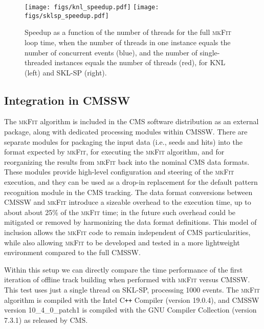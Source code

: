 \documentclass[a4paper,11pt]{article}
\newcommand{\mkFit}{\textsc{mkFit}\xspace}
\newcommand{\cpp}{C\texttt{++}\xspace}
\newcommand{\Intel}{Intel\textregistered\xspace}
\begin{document}
\begin{figure}[htbp]
  \begin{center}
    \texttt{[image: figs/knl\_speedup.pdf]}    
    \texttt{[image: figs/sklsp\_speedup.pdf]}
    \caption{Speedup as a function of the number of threads for the full \mkFit loop time, 
      when the number of threads in one instance equals the number of concurrent events (blue), and the number of 
      single-threaded instances equals the number of threads (red), for KNL (left) and SKL-SP
      (right).}
    \label{fig:mkfit_time_thru}
  \end{center}
\end{figure}

\subsection{Integration in CMSSW}
\label{CMSSW}

The \mkFit algorithm is included in the CMS software distribution as an external package, along with dedicated processing modules within CMSSW. There are separate modules for packaging the input data (i.e., seeds and hits) into the format expected by \mkFit, for executing the \mkFit algorithm, and for reorganizing the results from \mkFit back into the nominal CMS data formats. These modules provide high-level configuration and steering of the \mkFit execution, and they can be used as a drop-in replacement for the default pattern recognition module in the CMS tracking. The data format conversions between CMSSW and \mkFit introduce a sizeable overhead to the execution time, up to about about 25\% of the \mkFit time; in the future such overhead could be mitigated or removed by harmonizing the data format definitions. This model of inclusion allows the \mkFit code to remain independent of CMS particularities, while also allowing \mkFit to be developed and tested in a more lightweight environment compared to the full CMSSW. 

Within this setup we can directly compare the time performance of the first iteration of offline track building when performed with \mkFit versus CMSSW. 
This test uses just a single thread on SKL-SP, processing 1000 events. 
The \mkFit algorithm is compiled with the \Intel \cpp Compiler (version 19.0.4), and
CMSSW version 10\_4\_0\_patch1 is compiled with the GNU Compiler Collection (version 7.3.1) as released by CMS.
\end{document}
